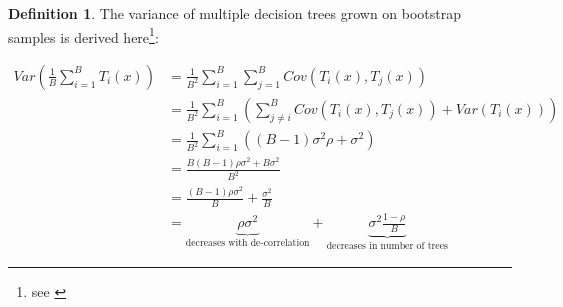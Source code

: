 \documentclass[12pt, a4paper, abstract, parskip]{scrartcl}
\theoremstyle{definition}
\newtheorem{definition}{Definition}[subsection]
\begin{document}
\begin{definition}
The variance of multiple decision trees grown on bootstrap samples is derived
here\footnote{see \cite{friedman2009elements}}:

\begin{align*}
Var(\frac{1}{B}\sum^B_{i=1}T_i(x)) &= \frac{1}{B^2}\sum^B_{i=1}\sum^B_{j=1}Cov(T_i(x), T_j(x))\\
&= \frac{1}{B^2}\sum^B_{i=1}(\sum^B_{j\neq i}Cov(T_i(x), T_j(x)) + Var(T_i(x)))\\
&= \frac{1}{B^2}\sum^B_{i=1} ((B-1)\sigma^2\rho + \sigma^2)\\
&= \frac{B(B-1)\rho\sigma^2 + B\sigma^2}{B^2}\\
&= \frac{(B-1)\rho\sigma^2}{B} + \frac{\sigma^2}{B}\\
&= \underbrace{\rho\sigma^2}_{\text{decreases with de-correlation}} + \underbrace{\sigma^2 \frac{1-\rho}{B}}_{\text{decreases in number of trees}}
\end{align*}
\label{def:bootstrap}
\end{definition}\vspace{2cm}
\end{document}
